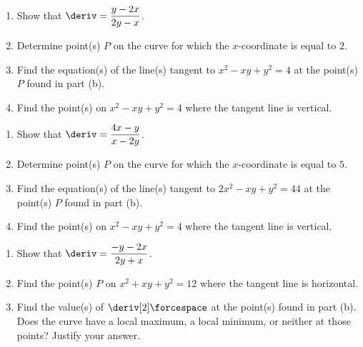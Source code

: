 \begin{enumerate}[label=\hspace{11pt}(\alph*), align=left, leftmargin=*, labelsep=0.25em]
    \item Show that $\deriv = \dfrac{y - 2x}{2y - x}$.
    \item Determine point(s) $P$ on the curve for which the $x$-coordinate is equal to $2$.
    \item Find the equation(s) of the line(s) tangent to $x^2 - xy + y^2 = 4$ at the point(s) $P$ found in part (b).
    \item Find the point(s) on $x^2 - xy + y^2 = 4$ where the tangent line is vertical.
\end{enumerate} \vspace{11pt}

\begin{enumerate}[label=\hspace{11pt}(\alph*), align=left, leftmargin=*, labelsep=0.25em]
    \item Show that $\deriv = \dfrac{4x - y}{x - 2y}$.
    \item Determine point(s) $P$ on the curve for which the $x$-coordinate is equal to $5$.
    \item Find the equation(s) of the line(s) tangent to $2x^2 - xy + y^2 = 44$ at the point(s) $P$ found in part (b).
    \item Find the point(s) on $x^2 - xy + y^2 = 4$ where the tangent line is vertical.
\end{enumerate} \vspace{11pt}

\begin{enumerate}[label=\hspace{11pt}(\alph*), align=left, leftmargin=*, labelsep=0.25em]
    \item Show that $\deriv = \dfrac{-y - 2x}{2y + x}$.
    \item Find the point(s) $P$ on $x^2 + xy + y^2 = 12$ where the tangent line is horizontal.
    \item Find the value(s) of $\deriv[2] \forcespace$ at the point(s) found in part (b). Does the curve have a local maximum, a local minimum, or neither at those points? Justify your answer.
\end{enumerate} \vspace{11pt}
 
